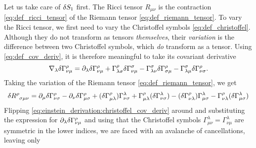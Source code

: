
Let us take care of $\delta S_1$ first.
The Ricci tensor $R_{\mu \nu}$ is the contraction \eqref{eq:def_ricci_tensor} of the Riemann tensor \eqref{eq:def_riemann_tensor}.
To vary the Ricci tensor, we first need to vary the Christoffel symbols \eqref{eq:def_christoffel}.
Although they do not transform as tensors \emph{themselves}, their \emph{variation} is the difference between two Christoffel symbols, which \emph{do} transform as a tensor.
Using \cref{eq:def_cov_deriv}, it is therefore meaningful to take its covariant derivative
\begin{equation}
	\nabla_\lambda \delta \Gamma^\rho_{\nu \mu} = \partial_\lambda \delta \Gamma^\rho_{\nu \mu} 
	                                                 + \Gamma^\rho_{\lambda \sigma} \delta \Gamma{^\sigma_{\nu \mu}} 
	                                                 - \Gamma^\sigma_{\lambda \nu} \delta \Gamma{^\rho_{\sigma \mu}} 
	                                                 - \Gamma^\sigma_{\lambda \mu} \delta \Gamma{^\rho_{\nu \sigma}} .
	\label{eq:einstein_derivation:christoffel_cov_deriv}
\end{equation}
Taking the variation of the Riemann tensor \eqref{eq:def_riemann_tensor}, we get
\begin{equation}
	\variation{R\indices{^\rho_\sigma_\mu_\nu}} = \partial_\mu \variation{\Gamma^\rho_{\nu \sigma}}
	                                            - \partial_\nu \variation{\Gamma^\rho_{\mu \sigma}}
												+ (\variation{\Gamma^\rho_{\mu \lambda}}) \Gamma^\lambda_{\nu \sigma}
												+ \Gamma^\rho_{\mu \lambda} (\variation{\Gamma^\lambda_{\nu \sigma})}
												- (\variation{\Gamma^\rho_{\nu \lambda}}) \Gamma^\lambda_{\mu \sigma}
												- \Gamma^\rho_{\nu \lambda} (\variation{\Gamma^\lambda_{\mu \sigma})}
\end{equation}
Flipping \cref{eq:einstein_derivation:christoffel_cov_deriv} around and substituting the expression for $\partial_\lambda \delta \Gamma^\rho_{\nu \mu}$ and using that the Christoffel symbols $\Gamma^\lambda_{\mu \nu} = \Gamma^\lambda_{\nu \mu}$ are symmetric in the lower indices, we are faced with an avalanche of cancellations, leaving only
